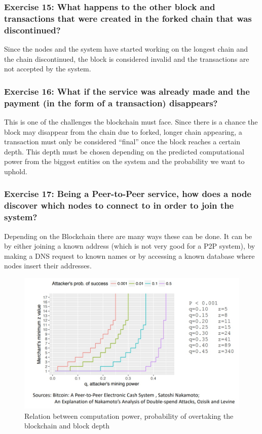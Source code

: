 \documentclass[12pt,a4paper]{article}
\begin{document}
\subsubsection*{Exercise 15: What happens to the other block and transactions that were created in the forked chain that was discontinued?}

Since the nodes and the system have started working on the longest chain and the chain discontinued, the block is considered invalid and the transactions are not accepted by the system.

\subsubsection*{Exercise 16: What if the service was already made and the payment (in the form of a transaction) disappears?}

This is one of the challenges the blockchain must face. Since there is a chance the block may disappear from the chain due to forked, longer chain appearing, a transaction must only be considered “final” once the block reaches a certain depth. This depth must be chosen depending on the predicted computational power from the biggest entities on the system and the probability we want to uphold.

\subsubsection*{Exercise 17: Being a Peer-to-Peer service, how does a node discover which nodes to connect to in order to join the system?}

Depending on the Blockchain there are many ways these can be done. It can be by either joining a known address (which is not very good for a P2P system), by making a DNS request to known names or by accessing a known database where nodes insert their addresses.

\begin{figure}[H]
    \centering
    \includegraphics[scale=0.4]{figures/Probability.jpg}
    \caption{Relation between computation power, probability of overtaking the blockchain and block depth}
    \label{fig:bcs}
\end{figure}
\end{document}

